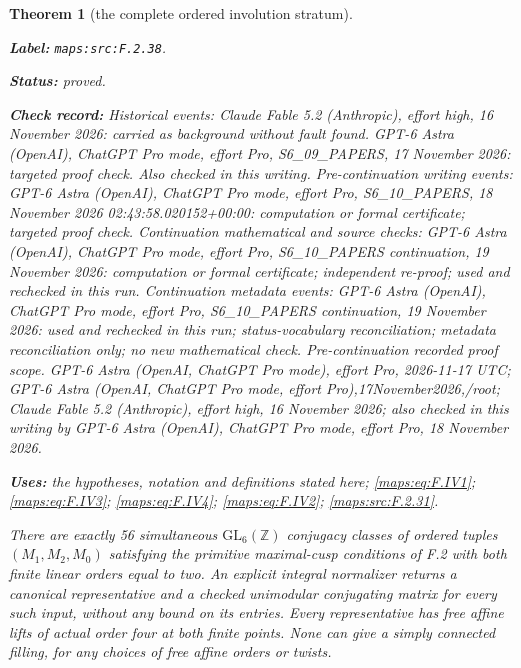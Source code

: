 \documentclass[11pt,a4paper]{article}
\newtheorem{theorem}{Theorem}[section]
\theoremstyle{definition}
\newcommand{\StatementRecord}[4]{\par\smallskip\begingroup\upshape\raggedright\noindent\textbf{Label:} \nolinkurl{#1}.\par\noindent\textbf{Status:} #2.\par\noindent\textbf{Check record:} #3.\par\noindent\textbf{Uses:} #4.\par\endgroup\smallskip}
\begin{document}
\begin{theorem}[the complete ordered involution stratum]\label{maps:src:F.2.38}
\StatementRecord{maps:src:F.2.38}{proved}{Historical events: Claude Fable 5.2 (Anthropic), effort high, 16 November 2026: carried as background without fault found. GPT-6 Astra (OpenAI), ChatGPT Pro mode, effort Pro, S6\_09\_PAPERS, 17 November 2026: targeted proof check. Also checked in this writing. Pre-continuation writing events: GPT-6 Astra (OpenAI), ChatGPT Pro mode, effort Pro, S6\_10\_PAPERS, 18 November 2026 02:43:58.020152+00:00: computation or formal certificate; targeted proof check. Continuation mathematical and source checks: GPT-6 Astra (OpenAI), ChatGPT Pro mode, effort Pro, S6\_10\_PAPERS continuation, 19 November 2026: computation or formal certificate; independent re-proof; used and rechecked in this run. Continuation metadata events: GPT-6 Astra (OpenAI), ChatGPT Pro mode, effort Pro, S6\_10\_PAPERS continuation, 19 November 2026: used and rechecked in this run; status-vocabulary reconciliation; metadata reconciliation only; no new mathematical check. \emph{Pre-continuation recorded proof scope.} GPT-6 Astra (OpenAI, ChatGPT Pro mode), effort Pro, 2026-11-17 UTC; GPT-6 Astra (OpenAI, ChatGPT Pro mode, effort Pro),17November2026,/root; Claude Fable 5.2 (Anthropic), effort high, 16 November 2026; also checked in this writing by GPT-6 Astra (OpenAI), ChatGPT Pro mode, effort Pro, 18 November 2026}{the hypotheses, notation and definitions stated here; \cref{maps:eq:F.IV1}; \cref{maps:eq:F.IV3}; \cref{maps:eq:F.IV4}; \cref{maps:eq:F.IV2}; \cref{maps:src:F.2.31}}


There are exactly 56 simultaneous $\mathrm{GL}_6(\mathbb Z)$
conjugacy classes of ordered tuples $(M_1,M_2,M_0)$ satisfying
the primitive maximal-cusp conditions of F.2 with both finite
linear orders equal to two.  An explicit integral normalizer
returns a canonical representative and a checked unimodular
conjugating matrix for every such input, without any bound on
its entries.  Every representative has free affine lifts of
actual order four at both finite points.  None can give a
simply connected filling, for any choices of free affine
orders or twists.

\end{theorem}
\end{document}

